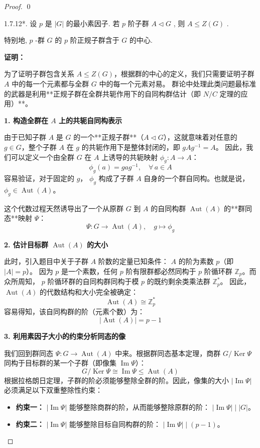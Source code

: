 \documentclass[]{article}
\begin{document}
\begin{proof}
\qed

1.7.12*. 设 $p$ 是 $|G|$ 的最小素因子. 若 $p$ 阶子群 $A \triangleleft G$ , 则 $A \leqslant Z(G)$ . 

特别地, $p$ -群 $G$ 的 $p$ 阶正规子群含于 $G$ 的中心. 

\bigskip
\noindent \textbf{证明：} 

为了证明子群包含关系 $A \leqslant Z(G)$，根据群的中心的定义，我们只需要证明子群 $A$ 中的每一个元素都与全群 $G$ 中的每一个元素对易。
群论中处理此类问题最标准的武器是利用**正规子群在全群共轭作用下的自同构群估计（即 $N/C$ 定理的应用）**。

\bigskip
\noindent \textbf{1. 构造全群在 $A$ 上的共轭自同构表示}

由于已知子群 $A$ 是 $G$ 的一个**正规子群**（$A \triangleleft G$），这就意味着对任意的 $g \in G$，整个子群 $A$ 在 $g$ 的共轭作用下是整体封闭的，即 $gAg^{-1} = A$。
因此，我们可以定义一个由全群 $G$ 在 $A$ 上诱导的共轭映射 $\phi_g: A \to A$：
\[ \phi_g(a) = gag^{-1}, \quad \forall \, a \in A \]
容易验证，对于固定的 $g$， $\phi_g$ 构成了子群 $A$ 自身的一个群自同构。也就是说， $\phi_g \in \operatorname{Aut}(A)$。

这个代数过程天然诱导出了一个从原群 $G$ 到 $A$ 的自同构群 $\operatorname{Aut}(A)$ 的**群同态**映射 $\Psi$：
\[ \Psi: G \longrightarrow \operatorname{Aut}(A), \quad g \mapsto \phi_g \]

\bigskip
\noindent \textbf{2. 估计目标群 $\operatorname{Aut}(A)$ 的大小}

此时，引入题目中关于子群 $A$ 阶数的定量已知条件： $A$ 的阶为素数 $p$（即 $|A| = p$）。
因为 $p$ 是一个素数，任何 $p$ 阶有限群都必然同构于 $p$ 阶循环群 $\mathbb{Z}_p$。而众所周知， $p$ 阶循环群的自同构群同构于模 $p$ 的既约剩余类乘法群 $\mathbb{Z}_p^*$。
因此， $\operatorname{Aut}(A)$ 的代数结构和大小完全被确定：
\[ \operatorname{Aut}(A) \cong \mathbb{Z}_p^* \]
容易得知，该自同构群的阶（元素个数）为：
\[ |\operatorname{Aut}(A)| = p - 1 \]

\bigskip
\noindent \textbf{3. 利用素因子大小的约束分析同态的像}

我们回到群同态 $\Psi: G \to \operatorname{Aut}(A)$ 中来。根据群同态基本定理，商群 $G/\operatorname{Ker}\Psi$ 同构于目标群的某一个子群（即像集 $\operatorname{Im}\Psi$）：
\[ G/\operatorname{Ker}\Psi \cong \operatorname{Im}\Psi \leqslant \operatorname{Aut}(A) \]
根据拉格朗日定理，子群的阶必须能够整除全群的阶。因此，像集的大小 $|\operatorname{Im}\Psi|$ 必须满足以下双重整除性约束：
\begin{itemize}
	\item \textbf{约束一：} $|\operatorname{Im}\Psi|$ 能够整除商群的阶，从而能够整除原群的阶： $|\operatorname{Im}\Psi| \;\big|\; |G|$。
	\item \textbf{约束二：} $|\operatorname{Im}\Psi|$ 能够整除目标自同构群的阶： $|\operatorname{Im}\Psi| \;\big|\; (p - 1)$。
\end{itemize}


\end{proof}
\end{document}
